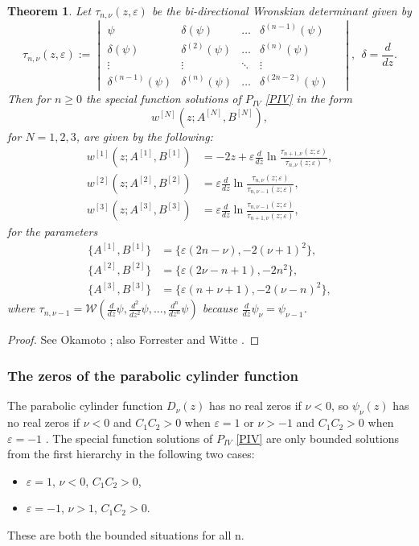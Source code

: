 \documentclass[12pt]{article}
\newtheorem{mydef}{Theorem}[section]
\numberwithin{figure}{section}
\numberwithin{equation}{section}
\numberwithin{table}{section}
\begin{document}
\begin{mydef}
Let $\tau_{n,\nu}(z,\varepsilon)$ be the bi-directional Wronskian determinant given by
\[
\tau_{n,\nu}(z,\varepsilon):=
\!\begin{vmatrix}
\psi & \delta(\psi) &\hdots& \delta^{(n-1)}(\psi) \\
\delta(\psi) & \delta^{(2)}(\psi) &\hdots& \delta^{(n)}(\psi)  \\
\vdots &\vdots & \ddots & \vdots & \\
\delta^{(n-1)}(\psi) & \delta^{(n)}(\psi) &\hdots& \delta^{(2n-2)}(\psi)
\end{vmatrix},~~\delta=\frac{d}{dz}.
\]
Then for $n\geq0$ the special function solutions of $P_{IV}$ \eqref{PIV} in the form $$w^{[N]}(z;A^{[N]},B^{[N]}),$$ for $N=1,2,3$, are given by the following:
\begin{subequations}
\begin{align*}
w^{[1]}(z;A^{[1]},B^{[1]})&=-2z+\varepsilon\frac{d}{dz}\ln\frac{\tau_{n+1,\nu}(z;\varepsilon)}{\tau_{n,\nu}(z;\varepsilon)},\\
w^{[2]}(z;A^{[2]},B^{[2]})&=\varepsilon\frac{d}{dz}\ln\frac{\tau_{n,\nu}(z;\varepsilon)}{\tau_{n,\nu-1}(z;\varepsilon)},\\
w^{[3]}(z;A^{[3]},B^{[3]})&=\varepsilon\frac{d}{dz}\ln\frac{\tau_{n,\nu-1}(z;\varepsilon)}{\tau_{n+1,\nu}(z;\varepsilon)},
\end{align*}
\end{subequations}
for the parameters
\begin{subequations}
\begin{align*}
\{A^{[1]},B^{[1]}\}&=\{\varepsilon(2n-\nu),-2(\nu+1)^2\},\\
\{A^{[2]},B^{[2]}\}&=\{\varepsilon(2\nu-n+1),-2n^2\},\\
\{A^{[3]},B^{[3]}\}&=\{\varepsilon(n+\nu+1),-2(\nu-n)^2\},
\end{align*}
\end{subequations}
where $\tau_{n,\nu-1}=\mathcal{W}(\frac{d}{dz}\psi,\frac{d^2}{dz^2}\psi,...,\frac{d^n}{dz^n}\psi)$ because $\frac{d}{dz}\psi_\nu=\psi_{\nu-1}$.
\end{mydef}
\begin{proof}
See Okamoto \cite{P:275:221}; also Forrester and Witte \cite{P:219:357}.
\end{proof}

\subsubsection{The zeros of the parabolic cylinder function}
The parabolic cylinder function $D_\nu(z)$ has no real zeros if $\nu<0$, so $\psi_\nu(z)$ has no real zeros if $\nu<0$ and $C_1C_2>0$ when $\varepsilon=1$ or $\nu>-1$ and $C_1C_2>0$ when $\varepsilon=-1$ \cite[\S12.11]{DLMF}.
The special function solutions of $P_{IV}$ \eqref{PIV} are only bounded solutions from the first hierarchy in the following two cases:
\begin{itemize}
\item $\varepsilon=1$, $\nu<0$, $C_1C_2>0$,
\item $\varepsilon=-1$, $\nu>1$, $C_1C_2>0$.
\end{itemize}
These are both the bounded situations for all n.
\end{document}
